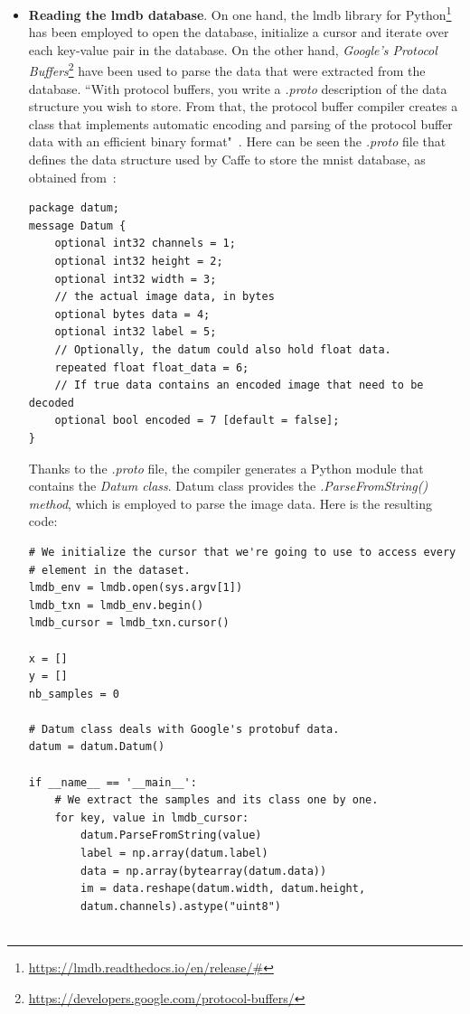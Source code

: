 \begin{itemize}
	\item \textbf{Reading the \gls{lmdb} database}. On one hand, the \gls{lmdb} library for Python\footnote{\url{https://lmdb.readthedocs.io/en/release/\#}} has been employed to open the database, initialize a cursor and iterate over each key-value pair in the database. On the other hand, \emph{Google's Protocol Buffers}\footnote{\url{https://developers.google.com/protocol-buffers/}} have been used to parse the data that were extracted from the database. ``With protocol buffers, you write a \textit{.proto} description of the data structure you wish to store. From that, the protocol buffer compiler creates a class that implements automatic encoding and parsing of the protocol buffer data with an efficient binary format"~\cite{protobuf}. Here can be seen the \textit{.proto} file that defines the data structure used by Caffe to store the \gls{mnist} database, as obtained from~\cite{lmdb_tutorial}: 
	
\begin{lstlisting}
package datum;
message Datum {
	optional int32 channels = 1;
	optional int32 height = 2;
	optional int32 width = 3;
	// the actual image data, in bytes
	optional bytes data = 4;
	optional int32 label = 5;
	// Optionally, the datum could also hold float data.
	repeated float float_data = 6;
	// If true data contains an encoded image that need to be decoded
	optional bool encoded = 7 [default = false];
}
\end{lstlisting}
	
	Thanks to the \textit{.proto} file, the compiler generates a Python module that contains the \emph{Datum class}. Datum class provides the \emph{\textit{.ParseFromString()} method}, which is employed to parse the image data. Here is the resulting code:

\begin{lstlisting}
# We initialize the cursor that we're going to use to access every
# element in the dataset.
lmdb_env = lmdb.open(sys.argv[1])
lmdb_txn = lmdb_env.begin()
lmdb_cursor = lmdb_txn.cursor()

x = []
y = []
nb_samples = 0

# Datum class deals with Google's protobuf data.
datum = datum.Datum()

if __name__ == '__main__':
	# We extract the samples and its class one by one.
	for key, value in lmdb_cursor:
		datum.ParseFromString(value)
		label = np.array(datum.label)
		data = np.array(bytearray(datum.data))
		im = data.reshape(datum.width, datum.height,
		datum.channels).astype("uint8")
	

\end{lstlisting}
\end{itemize}
